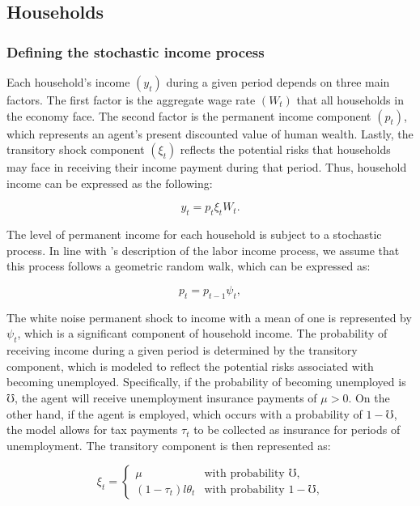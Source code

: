 \subsection{Households}

\subsubsection{Defining the stochastic income process}

\par Each household's income $(y_t)$ during a given period depends on three main factors. The first factor is the aggregate wage rate $(W_t)$ that all households in the economy face. The second factor is the permanent income component $(p_t)$, which represents an agent's present discounted value of human wealth. Lastly, the transitory shock component $(\xi_t)$ reflects the potential risks that households may face in receiving their income payment during that period. Thus, household income can be expressed as the following:

$$ y_t = p_t \xi_t W_t . $$

\par The level of permanent income for each household is subject to a stochastic process. In line with \cite{mf1957}'s description of the labor income process, we assume that this process follows a geometric random walk, which can be expressed as:

$$ p_t = p_{t-1} \psi_{t}, $$

\par The white noise permanent shock to income with a mean of one is represented by $\psi_t$, which is a significant component of household income. The probability of receiving income during a given period is determined by the transitory component, which is modeled to reflect the potential risks associated with becoming unemployed. Specifically, if the probability of becoming unemployed is $\mho$, the agent will receive unemployment insurance payments of $\mu > 0$. On the other hand, if the agent is employed, which occurs with a probability of $1 - \mho$, the model allows for tax payments $\tau_t$ to be collected as insurance for periods of unemployment. The transitory component is then represented as:

\begin{equation*}
\xi_t =
    \begin{cases}
        \mu & \text{with probability $\mho$,} \\
        (1-\tau_t) l \theta_t & \text{with probability $1-\mho$,}
    \end{cases}
\end{equation*}

